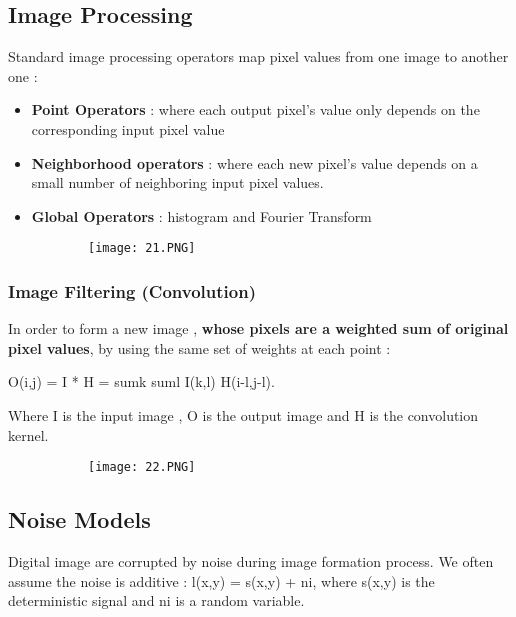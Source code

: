 \documentclass{article}
\begin{document}
\subsection{Image Processing}

Standard image processing operators map pixel values from one image to another one : 
\begin{itemize}
    \item \textbf{Point Operators} : where each output pixel's value only depends on the corresponding input pixel value
    \item \textbf{Neighborhood operators} : where each new pixel's value depends on a small number of neighboring input pixel values.
    \item \textbf{Global Operators} : histogram and Fourier Transform
\end{itemize}


\begin{figure}[ht!]
  \centering
  \begin{subfigure}[b]{0.4\linewidth}
    \texttt{[image: 21.PNG]}
  \end{subfigure}
\end{figure}

\subsubsection{Image Filtering (Convolution)}

In order to form a new image , \textbf{whose pixels are a weighted sum of original pixel values}, by using the same set of weights at each point : 

O(i,j) = I * H = sumk suml I(k,l) H(i-l,j-l).

Where I is the input image , O is the output image and H is the convolution kernel.

\begin{figure}[ht!]
  \centering
  \begin{subfigure}[b]{0.4\linewidth}
    \texttt{[image: 22.PNG]}
  \end{subfigure}
\end{figure}

\subsection{Noise Models}

Digital image are corrupted by noise during image formation process.
We often assume the noise is additive : l(x,y) = s(x,y) + ni, where s(x,y) is the deterministic signal and ni is a random variable.
\end{document}
